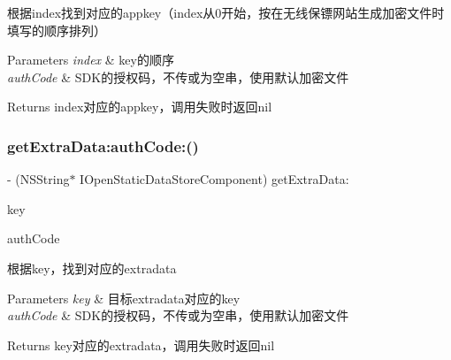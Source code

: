根据index找到对应的appkey（index从0开始，按在无线保镖网站生成加密文件时填写的顺序排列）


\begin{DoxyParams}{Parameters}
{\em index} & key的顺序\\
\hline
{\em auth\+Code} & S\+D\+K的授权码，不传或为空串，使用默认加密文件\\
\hline
\end{DoxyParams}
\begin{DoxyReturn}{Returns}
index对应的appkey，调用失败时返回nil 
\end{DoxyReturn}
\mbox{\label{protocol_i_open_static_data_store_component_01-p_a5221869990c818eda3489e48dd2aa837}} 
\subsubsection{\texorpdfstring{get\+Extra\+Data\+:auth\+Code\+:()}{getExtraData:authCode:()}}
{\footnotesize\ttfamily -\/ (N\+S\+String$\ast$ I\+Open\+Static\+Data\+Store\+Component) get\+Extra\+Data\+: \begin{DoxyParamCaption}\item[{(N\+S\+String $\ast$)}]{key }\item[{authCode:(N\+S\+String $\ast$)}]{auth\+Code }\end{DoxyParamCaption}}

根据key，找到对应的extradata


\begin{DoxyParams}{Parameters}
{\em key} & 目标extradata对应的key\\
\hline
{\em auth\+Code} & S\+D\+K的授权码，不传或为空串，使用默认加密文件\\
\hline
\end{DoxyParams}
\begin{DoxyReturn}{Returns}
key对应的extradata，调用失败时返回nil 
\end{DoxyReturn}
\mbox{\label{protocol_i_open_static_data_store_component_01-p_a1822b2ea73835a2d1495288a785c967c}} 
